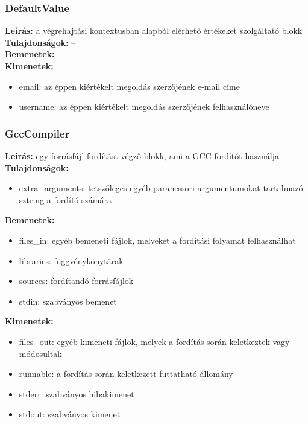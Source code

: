 \subsubsection{DefaultValue}
\textbf{Leírás:} a végrehajtási kontextusban alapból elérhető értékeket szolgáltató blokk \\
\textbf{Tulajdonságok:} -- \\
\textbf{Bemenetek:} -- \\
\textbf{Kimenetek:}
\begin{itemize}
    \item email: az éppen kiértékelt megoldás szerzőjének e-mail címe
    \item username: az éppen kiértékelt megoldás szerzőjének felhasználóneve
\end{itemize}

\subsubsection{GccCompiler}
\textbf{Leírás:} egy forrásfájl fordítást végző blokk, ami a GCC fordítót használja \\
\textbf{Tulajdonságok:}
\begin{itemize}
    \item extra\_arguments: tetszőleges egyéb parancssori argumentumokat tartalmazó sztring a fordító számára
\end{itemize}
\textbf{Bemenetek:}
\begin{itemize}
    \item files\_in: egyéb bemeneti fájlok, melyeket a fordítási folyamat felhasználhat
    \item libraries: függvénykönytárak
    \item sources: fordítandó forrásfájlok
    \item stdin: szabványos bemenet
\end{itemize}
\textbf{Kimenetek:}
\begin{itemize}
    \item files\_out: egyéb kimeneti fájlok, melyek a fordítás során keletkeztek vagy módosultak
    \item runnable: a fordítás során keletkezett futtatható állomány
    \item stderr: szabványos hibakimenet
    \item stdout: szabványos kimenet
\end{itemize}

